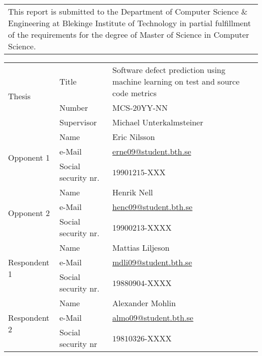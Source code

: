 {\pagestyle{empty}
\changepage{5cm}{1cm}{-0.5cm}{-0.5cm}{}{-2cm}{}{}{}
\noindent%
\begin{tabular}{p{\textwidth}}
{\small This report is submitted to the Department of Computer Science \& Engineering at Blekinge
Institute of Technology in partial fulfillment of the requirements for the degree of Master
of Science in Computer Science.}
\end{tabular}

\par\vspace{2cm}

\noindent
\begin{tabular}{|l|l|p{10cm}|}
	\hline
	\multirow{3}{*}{Thesis}		& Title					& Software defect prediction using machine learning on test and source code metrics\\ \cline{2-3}
								& Number				& MCS-20YY-NN\\ \cline{2-3}
								& Supervisor 			& Michael Unterkalmsteiner\\ \hline  
\multirow{3}{*}{Opponent 1}		& Name                  & Eric Nilsson\\
								& e-Mail                & \href{mailto:erne09@student.bth.se}{erne09@student.bth.se}\\
								& Social security nr.	& $19901215$-XXX	\\ \hline
\multirow{3}{*}{Opponent 2} 	& Name                  & Henrik Nell \\ %
								& e-Mail                & \href{mailto:henc09@student.bth.se}{henc09@student.bth.se} \\ %
								& Social security nr.	& 19900213-XXXX \\ \hline   
\multirow{3}{*}{Respondent 1}	& Name					& Mattias Liljeson \\ %
								& e-Mail                & \href{mailto:mdli09@student.bth.se}{mdli09@student.bth.se}\\ %
								& Social security nr.	& $19880904$-XXXX\\ \hline
 \multirow{3}{*}{Respondent 2}	& Name					& Alexander Mohlin\\ %
								& e-Mail                & \href{mailto:almo09@student.bth.se}{almo09@student.bth.se}\\ %
								& Social security nr    & $19810326$-XXXX\\ \hline
\end{tabular}

}
